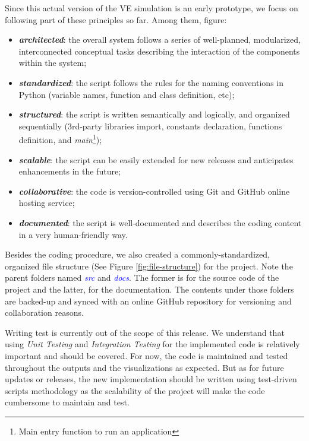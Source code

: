 Since this actual version of the VE simulation is an early prototype, we focus on following part of these principles so far. Among them, figure:
\begin{itemize}
    \item \textbf{\textit{architected}}: the overall system follows a series of well-planned, modularized, interconnected conceptual tasks describing the interaction of the components within the system;
    \item \textbf{\textit{standardized}}: the script follows the rules for the naming conventions in Python (variable names, function and class definition, etc);
    \item \textbf{\textit{structured}}: the script is written semantically and logically, and organized sequentially (3rd-party libraries import, constants declaration, functions definition, and \emph{main}\footnote{Main entry function to run an application});
    \item \textbf{\textit{scalable}}: the script can be easily extended for new releases and anticipates enhancements in the future;
    \item \textbf{\textit{collaborative}}: the code is version-controlled using Git and GitHub online hosting service;
    \item \textbf{\textit{documented}}: the script is well-documented and describes the coding content in a very human-friendly way.
\end{itemize}

Besides the coding procedure, we also created a commonly-standardized, organized file structure (See Figure \ref{fig:file-structure}) for the project. Note the parent folders named \textit{\textcolor{blue}{src}} and \textit{\textcolor{blue}{docs}}. The former is for the source code of the project and the latter, for the documentation. The contents under those folders are backed-up and synced with an online GitHub repository for versioning and collaboration reasons.

Writing test is currently out of the scope of this release. We understand that using \emph{Unit Testing} and \emph{Integration Testing} for the implemented code is relatively important and should be covered. For now, the code is maintained and tested throughout the outputs and the visualizations as expected. But as for future updates or releases, the new implementation should be written using test-driven scripts methodology as the scalability of the project will make the code cumbersome to maintain and test.

